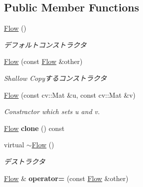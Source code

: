 \subsection*{Public Member Functions}
\begin{DoxyCompactItemize}
\item 
\hypertarget{classskl_1_1_flow_ac9975e144e606242748197798e87dd32}{}\label{classskl_1_1_flow_ac9975e144e606242748197798e87dd32} 
\hyperlink{classskl_1_1_flow_ac9975e144e606242748197798e87dd32}{Flow} ()
\begin{DoxyCompactList}\small\item\em デフォルトコンストラクタ \end{DoxyCompactList}\item 
\hypertarget{classskl_1_1_flow_a5a65e36c874c5cd5283ac32a33eb0a8b}{}\label{classskl_1_1_flow_a5a65e36c874c5cd5283ac32a33eb0a8b} 
\hyperlink{classskl_1_1_flow_a5a65e36c874c5cd5283ac32a33eb0a8b}{Flow} (const \hyperlink{classskl_1_1_flow}{Flow} \&other)
\begin{DoxyCompactList}\small\item\em Shallow Copyするコンストラクタ \end{DoxyCompactList}\item 
\hypertarget{classskl_1_1_flow_ae3ff785a69417be037a89377215e82a2}{}\label{classskl_1_1_flow_ae3ff785a69417be037a89377215e82a2} 
\hyperlink{classskl_1_1_flow_ae3ff785a69417be037a89377215e82a2}{Flow} (const cv\+::\+Mat \&u, const cv\+::\+Mat \&v)
\begin{DoxyCompactList}\small\item\em Constractor which sets u and v. \end{DoxyCompactList}\item 
\hypertarget{classskl_1_1_flow_a112fcdcc7ef094f98efe49d2f58e3024}{}\label{classskl_1_1_flow_a112fcdcc7ef094f98efe49d2f58e3024} 
\hyperlink{classskl_1_1_flow}{Flow} {\bfseries clone} () const
\item 
\hypertarget{classskl_1_1_flow_a5991efa6e8cf88c4ef2125cc727db333}{}\label{classskl_1_1_flow_a5991efa6e8cf88c4ef2125cc727db333} 
virtual \hyperlink{classskl_1_1_flow_a5991efa6e8cf88c4ef2125cc727db333}{$\sim$\+Flow} ()
\begin{DoxyCompactList}\small\item\em デストラクタ \end{DoxyCompactList}\item 
\hypertarget{classskl_1_1_flow_a0b978694e74a5b9fbd9cda8c30c81748}{}\label{classskl_1_1_flow_a0b978694e74a5b9fbd9cda8c30c81748} 
\hyperlink{classskl_1_1_flow}{Flow} \& {\bfseries operator=} (const \hyperlink{classskl_1_1_flow}{Flow} \&other)

\end{DoxyCompactItemize}
